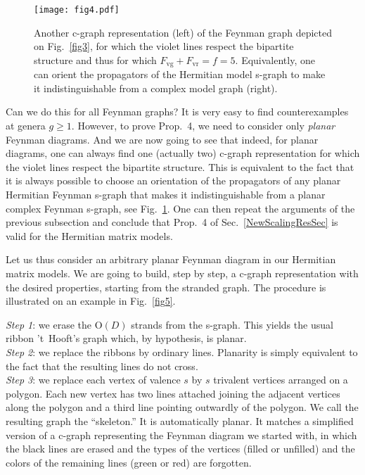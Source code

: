 \documentclass[12pt]{article}
\numberwithin{equation}{section}
\begin{document}
%
\begin{figure}
\centerline{\texttt{[image: fig4.pdf]}}
\caption{Another c-graph representation (left) of the Feynman graph depicted on Fig.\ \ref{fig3}, for which the violet lines respect the bipartite structure and thus for which $F_{\text{vg}}+F_{\text{vr}}=f=5$. Equivalently, one can orient the propagators of the Hermitian model s-graph to make it indistinguishable from a complex model graph (right).\label{fig4}}
\end{figure}
%

Can we do this for all Feynman graphs? It is very easy to find counterexamples at genera $g\geq 1$. However, to prove Prop.\ 4, we need to consider only \emph{planar} Feynman diagrams. And we are now going to see that indeed, for planar diagrams, one can always find one (actually two) c-graph representation for which the violet lines respect the bipartite structure. This is equivalent to the fact that it is always possible to choose  an orientation of the propagators of any planar Hermitian Feynman s-graph that makes it indistinguishable from a planar complex Feynman s-graph, see Fig.\ \ref{fig4}. One can then repeat the arguments of the previous subsection and conclude that Prop.\ 4 of Sec.\ \ref{NewScalingResSec} is valid for the Hermitian matrix models.

Let us thus consider an arbitrary planar Feynman diagram in our Hermitian matrix models. We are going to build, step by step, a c-graph representation with the desired properties, starting from the stranded graph. The procedure is illustrated on an example in Fig.\ \ref{fig5}. 

\noindent\emph{Step 1}: we erase the $\text{O}(D)$ strands from the s-graph. This yields the usual ribbon 't~Hooft's graph which, by hypothesis, is planar.\\
\emph{Step 2}: we replace the ribbons by ordinary lines. Planarity is simply equivalent to the fact that the resulting lines do not cross.\\
\emph{Step 3}: we replace each vertex of valence $s$ by $s$ trivalent vertices arranged on a polygon. Each new vertex has two lines attached joining the adjacent vertices along the polygon and a third line pointing outwardly of the polygon. We call the resulting graph the ``skeleton.'' It is automatically planar. It matches a simplified version of a c-graph representing the Feynman diagram we started with, in which the black lines are erased and the types of the vertices (filled or unfilled) and the colors of the remaining lines (green or red) are forgotten.
\end{document}
